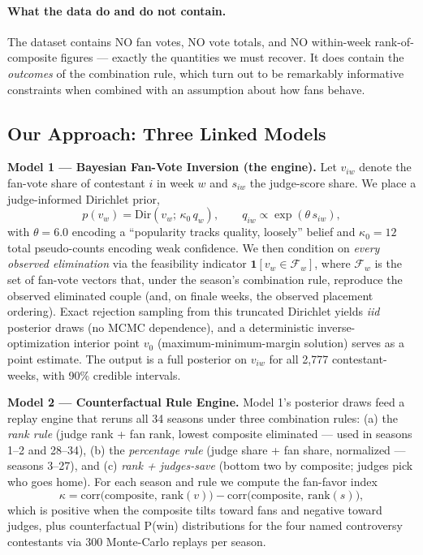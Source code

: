 \documentclass{article}
\begin{document}
\paragraph{What the data do and do not contain.} The dataset contains NO fan votes, NO vote totals, and NO within-week rank-of-composite figures --- exactly the quantities we must recover. It does contain the \emph{outcomes} of the combination rule, which turn out to be remarkably informative constraints when combined with an assumption about how fans behave.

\subsection{Our Approach: Three Linked Models}

\textbf{Model 1 --- Bayesian Fan-Vote Inversion (the engine).}
Let $v_{iw}$ denote the fan-vote share of contestant $i$ in week $w$ and $s_{iw}$ the judge-score share. We place a judge-informed Dirichlet prior,
\begin{equation}
p(v_w) = \mathrm{Dir}(v_w;\, \kappa_0\, q_w), \qquad q_{iw} \propto \exp(\theta\, s_{iw}),
\label{eq:intro-prior}
\end{equation}
with $\theta = 6.0$ encoding a ``popularity tracks quality, loosely'' belief and $\kappa_0 = 12$ total pseudo-counts encoding weak confidence. We then condition on \emph{every observed elimination} via the feasibility indicator $\mathbf{1}[v_w \in \mathcal{F}_w]$, where $\mathcal{F}_w$ is the set of fan-vote vectors that, under the season's combination rule, reproduce the observed eliminated couple (and, on finale weeks, the observed placement ordering). Exact rejection sampling from this truncated Dirichlet yields \emph{iid} posterior draws (no MCMC dependence), and a deterministic inverse-optimization interior point $v_0$ (maximum-minimum-margin solution) serves as a point estimate. The output is a full posterior on $v_{iw}$ for all 2{,}777 contestant-weeks, with 90\% credible intervals.

\textbf{Model 2 --- Counterfactual Rule Engine.}
Model 1's posterior draws feed a replay engine that reruns all 34 seasons under three combination rules: (a) the \emph{rank rule} (judge rank + fan rank, lowest composite eliminated --- used in seasons 1--2 and 28--34), (b) the \emph{percentage rule} (judge share + fan share, normalized --- seasons 3--27), and (c) \emph{rank + judges-save} (bottom two by composite; judges pick who goes home). For each season and rule we compute the fan-favor index
\begin{equation}
\kappa = \mathrm{corr}\big(\text{composite},\, \mathrm{rank}(v)\big) - \mathrm{corr}\big(\text{composite},\, \mathrm{rank}(s)\big),
\label{eq:intro-kappa}
\end{equation}
which is positive when the composite tilts toward fans and negative toward judges, plus counterfactual P(win) distributions for the four named controversy contestants via 300 Monte-Carlo replays per season.
\end{document}

